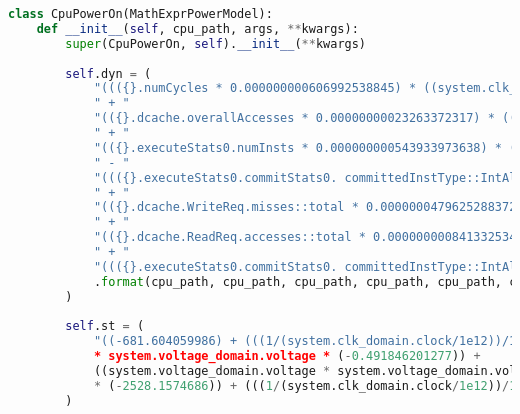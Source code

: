 \begin{lstlisting}[language=Python,caption={Integración de modelado de energía en Gem5},label=lst:addPower,showstringspaces=false,frame=single]
class CpuPowerOn(MathExprPowerModel):
    def __init__(self, cpu_path, args, **kwargs):
        super(CpuPowerOn, self).__init__(**kwargs)
        
        self.dyn = (
            "((({}.numCycles * 0.000000000606992538845) * ((system.clk_domain.clock * 1501.5 * (0.8688*0.8688) *1e12)/(simSeconds*1e18)))"
            " + "
            "(({}.dcache.overallAccesses * 0.00000000023263372317) * ((system.clk_domain.clock * 1501.5 * (0.8688*0.8688) *1e12)/(simSeconds*1e18)))"
            " + "
            "(({}.executeStats0.numInsts * 0.000000000543933973638) * ((system.clk_domain.clock * 1501.5 * (0.8688*0.8688) *1e12)/(simSeconds*1e18)))"
            " - "
            "((({}.executeStats0.commitStats0. committedInstType::IntAlu * 0.000000000543933973638) + ({}.commitStats0. committedInstType::IntMult * 0.000000000543933973638) + ({}.commitStats0. committedInstType::IntDiv * 0.000000000543933973638)) * ((system.clk_domain.clock * 1501.5 * (0.8688*0.8688) *1e12)/(simSeconds*1e18)))"
            " + "
            "(({}.dcache.WriteReq.misses::total * 0.0000000479625288372) * ((system.clk_domain.clock * 1501.5 * (0.8688*0.8688) *1e12)/(simSeconds*1e18)))"
            " + "
            "(({}.dcache.ReadReq.accesses::total * 0.000000000841332534886) * ((system.clk_domain.clock * 1501.5 * (0.8688*0.8688) *1e12)/(simSeconds*1e18)))"
            " + "
            "((({}.executeStats0.commitStats0. committedInstType::IntAlu * 0.000000000244859350364) + ({}.commitStats0. committedInstType::IntMult * 0.000000000244859350364) + ({}.commitStats0. committedInstType::IntDiv * 0.000000000244859350364)) * ((system.clk_domain.clock * 1501.5 * (0.8688*0.8688) *1e12)/(simSeconds*1e18))))"
            .format(cpu_path, cpu_path, cpu_path, cpu_path, cpu_path, cpu_path, cpu_path, cpu_path, cpu_path, cpu_path, cpu_path)
        )
        
        self.st = (
            "((-681.604059986) + (((1/(system.clk_domain.clock/1e12))/1e6) * 0.117551170367) + (system.voltage_domain.voltage * 2277.16890778) + (((1/(system.clk_domain.clock/1e12))/1e6)
            * system.voltage_domain.voltage * (-0.491846201277)) + 
            ((system.voltage_domain.voltage * system.voltage_domain.voltage) 
            * (-2528.1574686)) + (((1/(system.clk_domain.clock/1e12))/1e6)* (system.voltage_domain.voltage *system.voltage_domain.voltage) * 0.645456768269) + ((system.voltage_domain.voltage * system.voltage_domain.voltage * system.voltage_domain.voltage) * 932.937276293) + (((1/(system.clk_domain.clock/1e12))/1e6) * (system.voltage_domain.voltage * system.voltage_domain.voltage * system.voltage_domain.voltage) * (-0.271180478671))*(-1))"
        )


\end{lstlisting}

